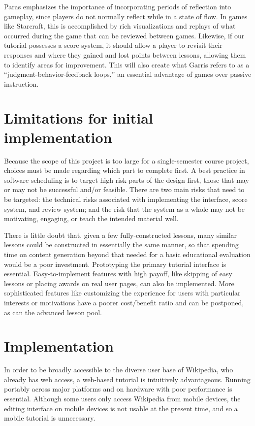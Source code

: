 \documentclass{acm_proc_article-sp}
\begin{document}
Paras\cite{Paras:2005} emphasizes the importance of incorporating periods of reflection into gameplay, since players do not normally reflect while in a state of flow. In games like Starcraft, this is accomplished by rich visualizations and replays of what occurred during the game that can be reviewed between games. Likewise, if our tutorial possesses a score system, it should allow a player to revisit their responses and where they gained and lost points between lessons, allowing them to identify areas for improvement. This will also create what Garris\cite{Garris:2002} refers to as a ``judgment-behavior-feedback loops,'' an essential advantage of games over passive instruction.

\section{Limitations for initial implementation}

Because the scope of this project is too large for a single-semester course project, choices must be made regarding which part to complete first. A best practice in software scheduling is to target high risk parts of the design first, those that may or may not be successful and/or feasible.\cite{Boehm:1988} There are two main risks that need to be targeted: the technical risks associated with implementing the interface, score system, and review system; and the risk that the system as a whole may not be motivating, engaging, or teach the intended material well.

There is little doubt that, given a few fully-constructed lessons, many similar lessons could be constructed in essentially the same manner, so that spending time on content generation beyond that needed for a basic educational evaluation would be a poor investment. Prototyping the primary tutorial interface is essential. Easy-to-implement features with high payoff, like skipping of easy lessons or placing awards on real user pages, can also be implemented. More sophisticated features like customizing the experience for users with particular interests or motivations have a poorer cost/benefit ratio and can be postponed, as can the advanced lesson pool.

\section{Implementation}

In order to be broadly accessible to the diverse user base of Wikipedia, who already has web access, a web-based tutorial is intuitively advantageous. Running portably across major platforms and on hardware with poor performance is essential. Although some users only access Wikipedia from mobile devices, the editing interface on mobile devices is not usable at the present time, and so a mobile tutorial is unnecessary.
\end{document}
